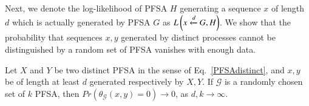 \documentclass[9pt,journal]{IEEEtran}
\begin{document}
{ Next, we denote the  log-likelihood of PFSA $H$ generating a sequence $x$ of length $d$  which is actually generated by PFSA $G$ as $L\left( x\xleftarrow{d} G, H \right)$. We show that the probability  that sequences $x,y$ generated by distinct processes    cannot be distinguished by a random set of PFSA vanishes with enough data.
   \begin{thm}\label{thmapproxmetric}
   	Let $X$ and $Y$ be two distinct PFSA in the sense of Eq.~\eqref{PFSAdistinct}, and $x,y$ be of length at least $d$ generated respectively by $X,Y$. If $\mathcal{G}$ is a randomly chosen set of $k$ PFSA, then
 $Pr(\theta_\mathcal{G}(x,y)=0) \rightarrow 0$, as $d,k \rightarrow \infty$.
   \end{thm}
   
   
 
}
\end{document}
